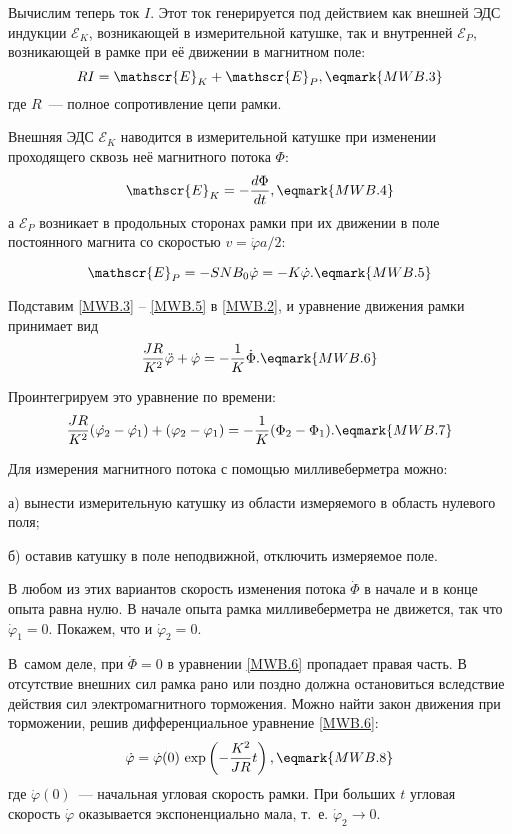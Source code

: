 Вычислим теперь ток $I$. Этот ток генерируется под действием как внешней ЭДС индукции $\mathscr{E}_K$, возникающей в измерительной катушке, так и внутренней $\mathscr{E}_P$, возникающей в рамке при её движении в магнитном поле:
\begin{equation}
	RI=\mathscr{E}_K+\mathscr{E}_P,
	\eqmark{MWB.3}
\end{equation}
где $R$~--- полное сопротивление цепи рамки.

Внешняя ЭДС $\mathscr{E}_K$ наводится в измерительной катушке при изменении проходящего сквозь неё магнитного потока $\Phi$:
\begin{equation}
	\mathscr{E}_K=-\frac{d\Phi}{dt},
	\eqmark{MWB.4}
\end{equation}
а $\mathscr{E}_P$ возникает в продольных сторонах рамки при их движении в поле постоянного магнита со скоростью $v=\dot{\varphi}a/2$:

\begin{equation}
	\mathscr{E}_P=-SNB_0\dot\varphi=-K\dot\varphi.
	\eqmark{MWB.5}
\end{equation}

Подставим \eqref{MWB.3} -- \eqref{MWB.5} в \eqref{MWB.2}, и уравнение движения рамки принимает вид
\begin{equation}
	\frac{JR}{K^2}\ddot{\varphi}+\dot{\varphi}=-\frac{1}{K}\dot{\Phi}.
	\eqmark{MWB.6}
\end{equation}

Проинтегрируем это уравнение по времени:
\begin{equation}
	\frac{JR}{K^2}(\dot{\varphi_2}-\dot{\varphi_1})+(\varphi_2-\varphi_1)=-\frac{1}{K}(\Phi_2-\Phi_1).
	\eqmark{MWB.7}
\end{equation}

Для измерения магнитного потока с помощью милливеберметра можно:

а) вынести измерительную катушку из области измеряемого в область нулевого поля;

б) оставив катушку в поле неподвижной, отключить измеряемое поле.

В любом  из этих вариантов скорость изменения потока $\dot{\Phi}$ в начале и в конце опыта равна нулю. В начале опыта рамка милливеберметра не движется, так что $\dot{\varphi}_1=0$. Покажем, что и $\dot{\varphi}_2=0$.

В~самом деле, при $\dot{\Phi}=0$ в уравнении \eqref{MWB.6} пропадает правая часть. В отсутствие внешних сил рамка рано или поздно должна остановиться вследствие действия сил электромагнитного торможения. Можно найти закон движения при торможении, решив дифференциальное уравнение \eqref{MWB.6}:
\begin{equation}
	\dot{\varphi}=\dot{\varphi}(0)\,\exp\left(-\frac{K^2}{JR}t\right),
	\eqmark{MWB.8}
\end{equation}
где $\dot{\varphi}(0)$~--- начальная угловая скорость рамки. При больших $t$ угловая скорость $\dot{\varphi}$ оказывается экспоненциально мала, т.~е. $\dot{\varphi}_2\rightarrow 0$.

